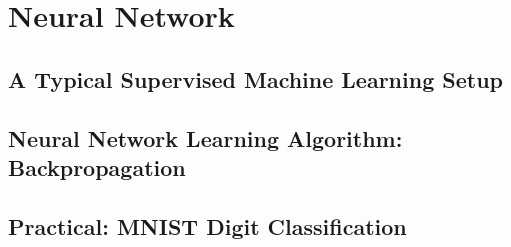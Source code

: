 \section{Neural Network}


\subsection{A Typical Supervised Machine Learning Setup}


\subsection{Neural Network Learning Algorithm: Backpropagation}


\subsection{Practical: MNIST Digit Classification}

